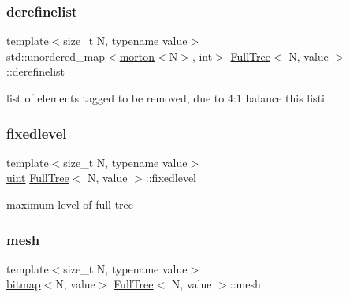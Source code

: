 \subsubsection{\texorpdfstring{derefinelist}{derefinelist}}
{\footnotesize\ttfamily template$<$size\+\_\+t N, typename value$>$ \\
std\+::unordered\+\_\+map$<$\mbox{\hyperlink{definitions_8h_af8682350bd8bb38ee9023f7a0a310add}{morton}}$<$N$>$, int$>$ \mbox{\hyperlink{classFullTree}{Full\+Tree}}$<$ N, value $>$\+::derefinelist\hspace{0.3cm}{\ttfamily [private]}}

list of elements tagged to be removed, due to 4\+:1 balance this listi \mbox{\label{classFullTree_a1bcc4d0daf8ad12569054422379b556f}} 
\subsubsection{\texorpdfstring{fixedlevel}{fixedlevel}}
{\footnotesize\ttfamily template$<$size\+\_\+t N, typename value$>$ \\
\mbox{\hyperlink{definitions_8h_a69aa29b598b851b0640aa225a9e5d61d}{uint}} \mbox{\hyperlink{classFullTree}{Full\+Tree}}$<$ N, value $>$\+::fixedlevel\hspace{0.3cm}{\ttfamily [private]}}

maximum level of full tree \mbox{\label{classFullTree_a98c8b05985b0cf911db0d6252aa98396}} 
\subsubsection{\texorpdfstring{mesh}{mesh}}
{\footnotesize\ttfamily template$<$size\+\_\+t N, typename value$>$ \\
\mbox{\hyperlink{definitions_8h_acf2396ef4de9eb8a6324b9f1a624ea85}{bitmap}}$<$N, value$>$ \mbox{\hyperlink{classFullTree}{Full\+Tree}}$<$ N, value $>$\+::mesh\hspace{0.3cm}{\ttfamily [private]}}

\mbox{\label{classFullTree_a91af9d7a974af6484dc61c20cd78d1bc}} 
